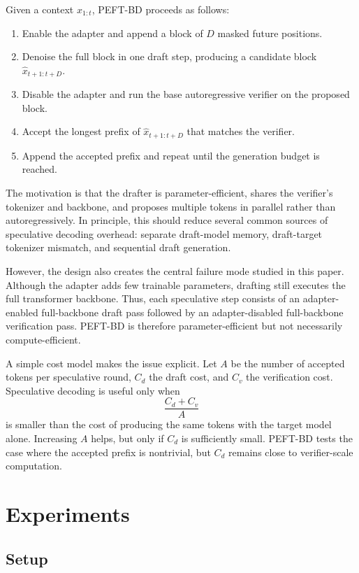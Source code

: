 \documentclass[11pt]{article}
\begin{document}
Given a context $x_{1:t}$, PEFT-BD proceeds as follows:
\begin{enumerate}
    \item Enable the adapter and append a block of $D$ masked future positions.
    \item Denoise the full block in one draft step, producing a candidate block $\hat{x}_{t+1:t+D}$.
    \item Disable the adapter and run the base autoregressive verifier on the proposed block.
    \item Accept the longest prefix of $\hat{x}_{t+1:t+D}$ that matches the verifier.
    \item Append the accepted prefix and repeat until the generation budget is reached.
\end{enumerate}

The motivation is that the drafter is parameter-efficient, shares the verifier's tokenizer and backbone, and proposes multiple tokens in parallel rather than autoregressively. In principle, this should reduce several common sources of speculative decoding overhead: separate draft-model memory, draft-target tokenizer mismatch, and sequential draft generation.

However, the design also creates the central failure mode studied in this paper. Although the adapter adds few trainable parameters, drafting still executes the full transformer backbone. Thus, each speculative step consists of an adapter-enabled full-backbone draft pass followed by an adapter-disabled full-backbone verification pass. PEFT-BD is therefore parameter-efficient but not necessarily compute-efficient.

A simple cost model makes the issue explicit. Let $A$ be the number of accepted tokens per speculative round, $C_d$ the draft cost, and $C_v$ the verification cost. Speculative decoding is useful only when
\[
    \frac{C_d + C_v}{A}
\]
is smaller than the cost of producing the same tokens with the target model alone. Increasing $A$ helps, but only if $C_d$ is sufficiently small. PEFT-BD tests the case where the accepted prefix is nontrivial, but $C_d$ remains close to verifier-scale computation.

\section{Experiments}

\subsection{Setup}
\end{document}
